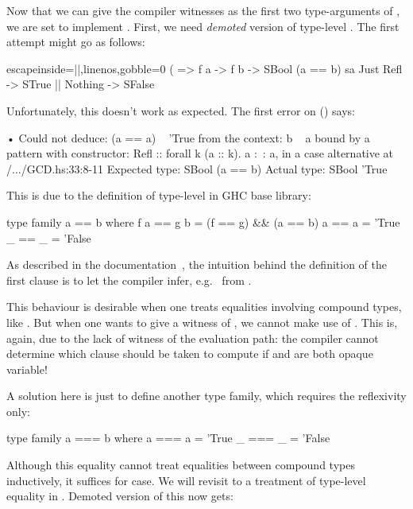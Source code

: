 \documentclass[demotion-paper.tex]{subfiles}
\begin{document}
Now that we can give the compiler witnesses as the first two type-arguments of , we are set to implement .
First, we need \emph{demoted} version of type-level \hask{(==)}.
The first attempt might go as follows:
\begin{code*}{escapeinside=||,linenos,gobble=0}
(%
      => f a -> f b -> SBool (a == b)
sa %
  Just Refl -> STrue |\label{line:trueclause}|
  Nothing -> SFalse
\end{code*}
Unfortunately, this doesn't work as expected.
The first error on  () says:

\begin{repl}
• Could not deduce: (a == a) ~ 'True
  from the context: b ~ a
    bound by a pattern with constructor:
               Refl :: forall k (a :: k). a :~: a,
             in a case alternative
    at /.../GCD.hs:33:8-11
  Expected type: SBool (a == b)
    Actual type: SBool 'True
\end{repl}

This is due to the definition of type-level \hask{(==)} in GHC base library:

\begin{code}
type family a == b where
  f a == g b = (f == g) && (a == b)
  a   == a   = 'True
  _   == _   = 'False
\end{code}
As described in the documentation~\cite{GHC-Team:2021aa}, the intuition behind the definition of the first clause is to let the compiler infer, e.g.\  from .

This behaviour is desirable when one treats equalities involving compound types, like .
But when one wants to give a witness of , we cannot make use of .
This is, again, due to the lack of witness of the evaluation path: the compiler cannot determine which clause should be taken to compute  if  and  are both opaque variable!

A solution here is just to define another type family, which requires the reflexivity only:
\begin{code}
type family a === b where
  a === a = 'True
  _ === _ = 'False
\end{code}

Although this equality cannot treat equalities between compound types inductively, it suffices for  case.
We will revisit to a treatment of type-level equality in .
Demoted version of this now gets:
\end{document}
